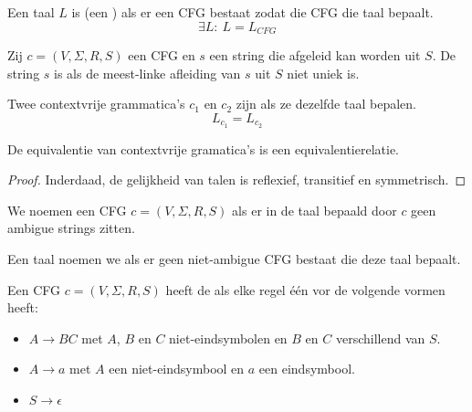 \documentclass[main.tex]{subfiles}
\begin{document}
\begin{de}
  Een taal $L$ is  (een ) als er een CFG bestaat zodat die CFG die taal bepaalt.
  \[ \exists L:\ L = L_{CFG} \]
\end{de}

\begin{de}
  Zij $c = (V,\Sigma,R,S)$ een CFG en $s$ een string die afgeleid kan worden uit $S$.
  De string $s$ is  als de meest-linke afleiding van $s$ uit $S$ niet uniek is. 
\end{de}

\begin{de}
  Twee contextvrije grammatica's $c_{1}$ en $c_{2}$ zijn  als ze dezelfde taal bepalen.
  \[ L_{c_{1}} = L_{c_{2}} \]
\end{de}

\begin{st}
  De equivalentie van contextvrije gramatica's is een equivalentierelatie.

  \begin{proof}
    Inderdaad, de gelijkheid van talen is reflexief, transitief en symmetrisch.
  \end{proof}
\end{st}

\begin{de}
  We noemen een CFG $c = (V,\Sigma,R,S)$  als er in de taal bepaald door $c$ geen ambigue strings zitten.
\end{de}

\begin{de}
  Een taal noemen we  als er geen niet-ambigue CFG bestaat die deze taal bepaalt.
\end{de}

\begin{de}
  Een CFG $c = (V,\Sigma,R,S)$ heeft de  als elke regel \'e\'en vor de volgende vormen heeft:
  \begin{itemize}
  \item $A \rightarrow BC$ met $A$, $B$ en $C$ niet-eindsymbolen en $B$ en $C$ verschillend van $S$.
  \item $A \rightarrow a$ met $A$ een niet-eindsymbool en $a$ een eindsymbool.
  \item $S \rightarrow \epsilon$
  \end{itemize}
\end{de}
\end{document}

